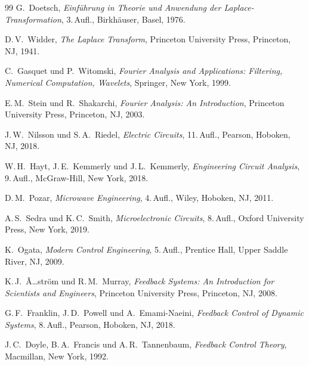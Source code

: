 ﻿\documentclass[a4paper,12pt]{report}
\theoremstyle{definition}
\begin{document}
\begin{thebibliography}{99}
G.~Doetsch,
\textit{Einführung in Theorie und Anwendung der Laplace-Transformation},
3.\,Aufl., Birkhäuser, Basel, 1976.

D.\,V.~Widder,
\textit{The Laplace Transform},
Princeton University Press, Princeton, NJ, 1941.

C.~Gasquet und P.~Witomski,
\textit{Fourier Analysis and Applications: Filtering, Numerical Computation, Wavelets},
Springer, New York, 1999.

E.\,M.~Stein und R.~Shakarchi,
\textit{Fourier Analysis: An Introduction},
Princeton University Press, Princeton, NJ, 2003.

J.\,W.~Nilsson und S.\,A.~Riedel,
\textit{Electric Circuits},
11.\,Aufl., Pearson, Hoboken, NJ, 2018.

W.\,H.~Hayt, J.\,E.~Kemmerly und J.\,L.~Kemmerly,
\textit{Engineering Circuit Analysis},
9.\,Aufl., McGraw-Hill, New York, 2018.

D.\,M.~Pozar,
\textit{Microwave Engineering},
4.\,Aufl., Wiley, Hoboken, NJ, 2011.

A.\,S.~Sedra und K.\,C.~Smith,
\textit{Microelectronic Circuits},
8.\,Aufl., Oxford University Press, New York, 2019.

K.~Ogata,
\textit{Modern Control Engineering},
5.\,Aufl., Prentice Hall, Upper Saddle River, NJ, 2009.

K.\,J.~Ã…ström und R.\,M.~Murray,
\textit{Feedback Systems: An Introduction for Scientists and Engineers},
Princeton University Press, Princeton, NJ, 2008.

G.\,F.~Franklin, J.\,D.~Powell und A.~Emami-Naeini,
\textit{Feedback Control of Dynamic Systems},
8.\,Aufl., Pearson, Hoboken, NJ, 2018.

J.\,C.~Doyle, B.\,A.~Francis und A.\,R.~Tannenbaum,
\textit{Feedback Control Theory},
Macmillan, New York, 1992.


\end{thebibliography}
\end{document}
